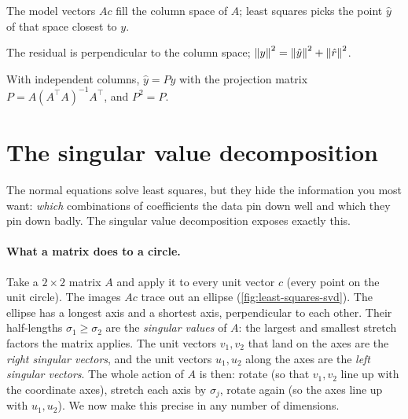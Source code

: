 \begin{keyideas}
\item The model vectors $Ac$ fill the column space of $A$; least squares picks the point $\hat y$ of that space closest to $y$.
\item The residual is perpendicular to the column space; $\left\lVert y\right\rVert^2 = \left\lVert \hat y\right\rVert^2 + \left\lVert \hat r\right\rVert^2$.
\item With independent columns, $\hat y = Py$ with the projection matrix $P = A(A^\top A)^{-1}A^\top$, and $P^2 = P$.
\end{keyideas}

\section{The singular value decomposition}\label{sec:least-squares-svd}

The normal equations solve least squares, but they hide the information you most want: \emph{which} combinations of coefficients the data pin down well and which they pin down badly. The singular value decomposition exposes exactly this.

\paragraph{What a matrix does to a circle.} Take a $2\times2$ matrix $A$ and apply it to every unit vector $c$ (every point on the unit circle). The images $Ac$ trace out an ellipse (\cref{fig:least-squares-svd}). The ellipse has a longest axis and a shortest axis, perpendicular to each other. Their half-lengths $\sigma_1 \ge \sigma_2$ are the \emph{singular values} of $A$: the largest and smallest stretch factors the matrix applies. The unit vectors $v_1, v_2$ that land on the axes are the \emph{right singular vectors}, and the unit vectors $u_1,u_2$ along the axes are the \emph{left singular vectors}. The whole action of $A$ is then: rotate (so that $v_1, v_2$ line up with the coordinate axes), stretch each axis by $\sigma_j$, rotate again (so the axes line up with $u_1, u_2$). We now make this precise in any number of dimensions.

